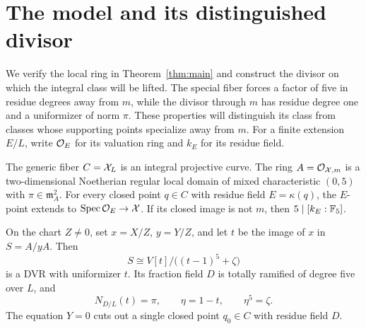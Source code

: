 \section{The model and its distinguished divisor}\label{sec:model}

We verify the local ring in Theorem~\ref{thm:main} and construct the
divisor on which the integral class will be lifted. The special fiber
forces a factor of five in residue degrees away from $m$, while the
divisor through $m$ has residue degree one and a uniformizer of norm
$\pi$. These properties will distinguish its class from classes
whose supporting points specialize away from $m$. For a finite
extension $E/L$, write $\mathcal O_E$ for its valuation ring and $k_E$
for its residue field.

\begin{lemma}\label{lem:model}
The generic fiber $C=\mathcal X_L$ is an integral projective curve. The
ring $A=\mathcal O_{\mathcal X,m}$ is a two-dimensional Noetherian regular local
domain of mixed characteristic $(0,5)$ with
$\pi\in\mathfrak m_A^2$. For every closed point $q\in C$
with residue field $E=\kappa(q)$, the $E$-point extends to
$\operatorname{Spec}\mathcal O_E\to\mathcal X$. If its closed image is not $m$, then
$5\mid[k_E:\mathbb F_5]$.

On the chart $Z\ne0$, set $x=X/Z$, $y=Y/Z$, and let $t$ be the
image of $x$ in $S=A/yA$. Then
\begin{equation}\label{eq:divisor}
 S\cong V[t]/\bigl((t-1)^5+\zeta\bigr)
\end{equation}
is a DVR with uniformizer $t$. Its fraction field $D$ is totally
ramified of degree five over $L$, and
\begin{equation}\label{eq:norm-t}
 N_{D/L}(t)=\pi,\qquad \eta=1-t,\qquad \eta^5=\zeta.
\end{equation}
The equation $Y=0$ cuts out a single closed point $q_0\in C$
with residue field $D$.
\end{lemma}

